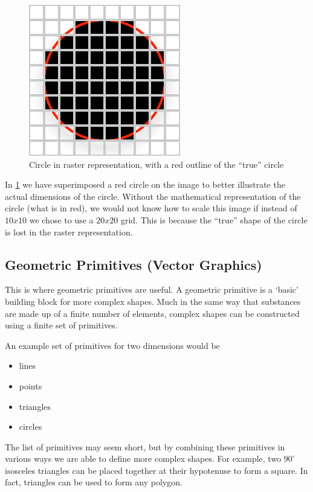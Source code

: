 \documentclass[authoryearcitations]{UoYCSproject}
\begin{document}
\begin{figure}[h]
  \centering
  \includegraphics[scale=1.0]{figures/rasterCircle.eps}
    \caption{Circle in raster representation, with a red outline of the ``true'' circle}
  \label{rasterCircle}
\end{figure}

In \ref{rasterCircle} we have superimposed a red circle on the image to better illustrate the actual dimensions of the circle. 
Without the mathematical representation of the circle (what is in red), we would not know how to scale this image if instead of
$10x10$ we chose to use a $20x20$ grid. This is because the ``true'' shape of the circle is lost in the raster representation.  

\subsection{Geometric Primitives (Vector Graphics)}

This is where geometric primitives are useful. A geometric primitive is a `basic' building block for more complex shapes. 
Much in the same way that substances are made up of a finite number of elements, complex shapes can be constructed using
a finite set of primitives. 

An example set of primitives for two dimensions would be

\begin{itemize}
        \item lines
        \item points
        \item triangles
        \item circles
\end{itemize}

The list of primitives may seem short, but by combining these primitives in various ways we are able to define more
complex shapes. For example, two $90^{\circ}$ isosceles triangles can be placed together at their hypotenuse to form 
a square. In fact, triangles can be used to form any polygon. 
\end{document}
